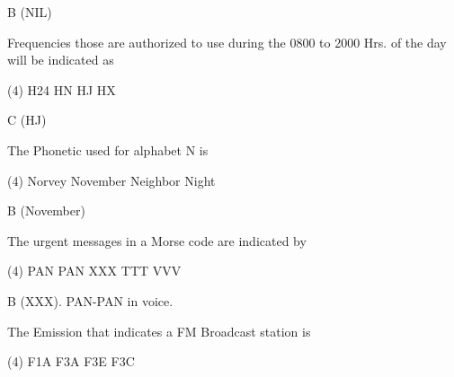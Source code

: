 \documentclass[a4paper]{article}
\begin{document}
\begin{solution}
	B (NIL)
\end{solution}

\vspace{5mm}



\begin{question}Frequencies those are authorized to use during the 0800 to 2000 Hrs. of the day will be indicated as \spaces
	\begin{tasks}(4)
		\task H24
		\task HN
		\task HJ
		\task HX
	\end{tasks}
\end{question}

\begin{solution}
	C (HJ)
\end{solution}

\vspace{5mm}



\begin{question}The Phonetic used for alphabet \apostrophe{}N\apostrophe{} is \spaces
	\begin{tasks}(4)
		\task Norvey
		\task November
		\task Neighbor
		\task Night
	\end{tasks}
\end{question}


\begin{solution}
	B (November)
\end{solution}

\vspace{5mm}



\begin{question}The urgent messages in a Morse code are indicated by \spaces
	\begin{tasks}(4)
		\task PAN PAN
		\task XXX
		\task TTT
		\task VVV
	\end{tasks}
\end{question}

\begin{solution}
	B (XXX). PAN-PAN in voice.
\end{solution}

\vspace{5mm}



\begin{question}The Emission that indicates a FM Broadcast station is \spaces
	\begin{tasks}(4)
		\task F1A
		\task F3A
		\task F3E
		\task F3C
	\end{tasks}
\end{question}
\end{document}
